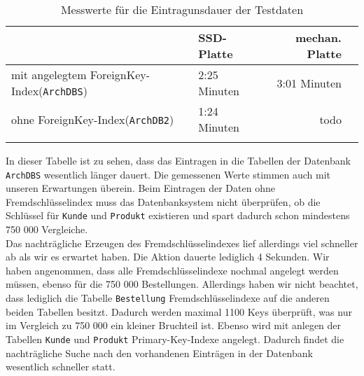\begin{longtable}{|l|l|r|r|} \hline
& SSD-Platte & mechan. Platte \\ \hline
mit angelegtem ForeignKey-Index(\texttt{ArchDBS}) & 2:25 Minuten & 3:01 Minuten \\ \hline
ohne ForeignKey-Index(\texttt{ArchDB2}) & 1:24 Minuten & todo \\ \hline
\caption{Messwerte für die Eintragunsdauer der Testdaten}
\end{longtable}

In dieser Tabelle ist zu sehen, dass das Eintragen in die Tabellen der Datenbank \texttt{ArchDBS} wesentlich länger dauert. Die gemessenen Werte stimmen auch mit unseren Erwartungen überein. Beim Eintragen der Daten ohne Fremdschlüsselindex muss das Datenbanksystem nicht überprüfen, ob die Schlüssel für \texttt{Kunde} und \texttt{Produkt} existieren und spart dadurch schon mindestens 750 000 Vergleiche. \\

Das nachträgliche Erzeugen des Fremdschlüsselindexes lief allerdings viel schneller ab als wir es erwartet haben. Die Aktion dauerte lediglich 4 Sekunden. Wir haben angenommen, dass alle Fremdschlüsselindexe nochmal angelegt werden müssen, ebenso für die 750 000 Bestellungen. Allerdings haben wir nicht beachtet, dass lediglich die Tabelle \texttt{Bestellung} Fremdschlüsselindexe auf die anderen beiden Tabellen besitzt. Dadurch werden maximal 1100 Keys überprüft, was nur im Vergleich zu 750 000 ein kleiner Bruchteil ist. Ebenso wird mit anlegen der Tabellen \texttt{Kunde} und \texttt{Produkt} Primary-Key-Indexe angelegt. Dadurch findet die nachträgliche Suche nach den vorhandenen Einträgen in der Datenbank wesentlich schneller statt.